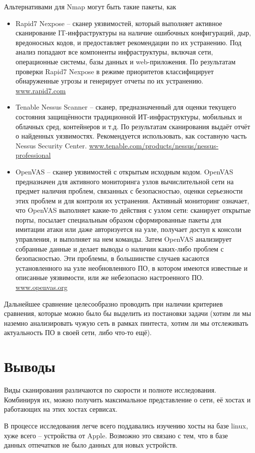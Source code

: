 Альтернативами для Nmap могут быть такие пакеты, как
\begin{itemize}
    \item Rapid7 Nexpose -- сканер уязвимостей, который выполняет активное сканирование IT-инфраструктуры на наличие ошибочных конфигураций, дыр, вредоносных кодов, и предоставляет рекомендации по их устранению. Под анализ попадают все компоненты инфраструктуры, включая сети, операционные системы, базы данных и web-приложения. По результатам проверки Rapid7 Nexpose в режиме приоритетов классифицирует обнаруженные угрозы и генерирует отчеты по их устранению. \url{www.rapid7.com}

    \item Tenable Nessus Scanner -- сканер, предназначенный для оценки текущего состояния защищённости традиционной ИТ-инфраструктуры, мобильных и облачных сред, контейнеров и т.д. По результатам сканирования выдаёт отчёт о найденных уязвимостях. Рекомендуется использовать, как составную часть Nessus Security Center. \url{www.tenable.com/products/nessus/nessus-professional}
    
    \item OpenVAS -- сканер уязвимостей с открытым исходным кодом. OpenVAS предназначен для активного мониторинга узлов вычислительной сети на предмет наличия проблем, связанных с безопасностью, оценки серьезности этих проблем и для контроля их устранения. Активный мониторинг означает, что OpenVAS выполняет какие-то действия с узлом сети: сканирует открытые порты, посылает специальным образом сформированные пакеты для имитации атаки или даже авторизуется на узле, получает доступ к консоли управления, и выполняет на нем команды. Затем OpenVAS анализирует собранные данные и делает выводы о наличии каких-либо проблем с безопасностью. Эти проблемы, в большинстве случаев касаются установленного на узле необновленного ПО, в котором имеются известные и описанные уязвимости, или же небезопасно настроенного ПО. \url{www.openvas.org}
\end{itemize}

Дальнейшее сравнение целесообразно проводить при наличии критериев сравнения, которые можно было бы выделить из постановки задачи (хотим ли мы наземно анализировать чужую сеть в рамках пинтеста, хотим ли мы отслеживать актуальность ПО в своей сети, либо что-то ещё).

\section*{Выводы}

Виды сканирования различаются по скорости и полноте исследования. Комбинируя их, можно получить максимальное представление о сети, её хостах и работающих на этих хостах сервисах.

В процессе исследования легче всего поддавались изучению хосты на базе linux, хуже всего -- устройства от Apple. Возможно это связано с тем, что в базе данных отпечатков не было данных для новых устройств.
